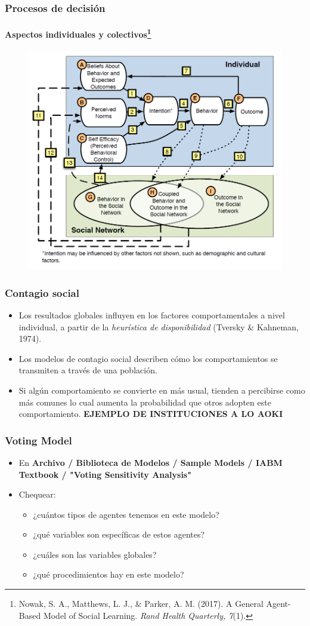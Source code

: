 \documentclass[11pt]{beamer}
\begin{document}
\begin{frame}
	\frametitle{Procesos de decisión}
	\framesubtitle{Aspectos individuales y colectivos\footnote{{\scriptsize Nowak, S. A., Matthews, L. J., \& Parker, A. M. (2017). A General Agent-Based Model of Social Learning. \textit{Rand Health Quarterly, 7}(1).}}}
	\begin{figure}
		\centering
		\includegraphics[width=0.7\linewidth]{figuras/influencia.png}
		\label{fig:influencia}
	\end{figure}
	
\end{frame}

\begin{frame}
	\frametitle{Contagio social}
\begin{itemize}
	\item Los resultados globales influyen en los factores comportamentales a nivel individual, a partir de la \textit{heurística de disponibilidad} (Tversky \& Kahneman, 1974).
    \item Los modelos de contagio social describen cómo los comportamientos se transmiten a través de una población.
    \item Si algún comportamiento se convierte en más usual, tienden a percibirse como más comunes lo cual aumenta la probabilidad que otros adopten este comportamiento. \textbf{EJEMPLO DE INSTITUCIONES A LO AOKI}
\end{itemize}
\end{frame}

\begin{frame}
	\frametitle{Voting Model}
\begin{itemize}
	\item En \textbf{Archivo / Biblioteca de Modelos / Sample Models / IABM Textbook / "Voting Sensitivity Analysis"}
	\item Chequear:
	\begin{itemize}
		\item ¿cuántos tipos de agentes tenemos en este modelo?
		\item ¿qué variables son específicas de estos agentes? 
		\item ¿cuáles son las variables globales?
		\item ¿qué procedimientos hay en este modelo?
	\end{itemize}
\end{itemize}		
\end{frame}
\end{document}
